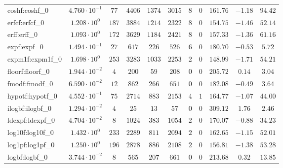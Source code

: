 \begin{tabular}{|l|c|c|c|c|c|c|c|c|c|c|}
coshf:coshf\_0               & $ 4.760 \cdot 10^{-1} $ & $ 77     $ & $ 4406  $ & $ 1374  $ & $ 3015  $ & $ 8   $ & $ 0 $ & $ 161.76      $ & $ -1.18   $ & $ 94.42   $ \\
erfcf:erfcf\_0               & $ 1.208 \cdot 10^{0}  $ & $ 187    $ & $ 3884  $ & $ 1214  $ & $ 2322  $ & $ 8   $ & $ 0 $ & $ 154.75      $ & $ -1.46   $ & $ 52.14   $ \\
erff:erff\_0                 & $ 1.093 \cdot 10^{0}  $ & $ 172    $ & $ 3629  $ & $ 1184  $ & $ 2421  $ & $ 8   $ & $ 0 $ & $ 157.33      $ & $ -1.36   $ & $ 61.16   $ \\
expf:expf\_0                 & $ 1.494 \cdot 10^{-1} $ & $ 27     $ & $ 617   $ & $ 226   $ & $ 526   $ & $ 6   $ & $ 0 $ & $ 180.70      $ & $ -0.53   $ & $ 5.72    $ \\
expm1f:expm1f\_0             & $ 1.698 \cdot 10^{0}  $ & $ 253    $ & $ 3283  $ & $ 1033  $ & $ 2253  $ & $ 2   $ & $ 0 $ & $ 148.99      $ & $ -1.71   $ & $ 54.21   $ \\
floorf:floorf\_0             & $ 1.944 \cdot 10^{-2} $ & $ 4      $ & $ 200   $ & $ 59    $ & $ 208   $ & $ 0   $ & $ 0 $ & $ 205.72      $ & $ 0.14    $ & $ 3.04    $ \\
fmodf:fmodf\_0               & $ 6.590 \cdot 10^{-2} $ & $ 12     $ & $ 862   $ & $ 266   $ & $ 651   $ & $ 0   $ & $ 0 $ & $ 182.08      $ & $ -0.49   $ & $ 3.64    $ \\
hypotf:hypotf\_0             & $ 4.552 \cdot 10^{-1} $ & $ 75     $ & $ 2714  $ & $ 883   $ & $ 2153  $ & $ 4   $ & $ 1 $ & $ 164.77      $ & $ -1.07   $ & $ 44.00   $ \\
ilogbf:ilogbf\_0             & $ 1.294 \cdot 10^{-2} $ & $ 4      $ & $ 25    $ & $ 13    $ & $ 57    $ & $ 0   $ & $ 0 $ & $ 309.12      $ & $ 1.76    $ & $ 2.46    $ \\
ldexpf:ldexpf\_0             & $ 4.704 \cdot 10^{-2} $ & $ 8      $ & $ 1024  $ & $ 383   $ & $ 1054  $ & $ 2   $ & $ 0 $ & $ 170.07      $ & $ -0.88   $ & $ 34.23   $ \\
log10f:log10f\_0             & $ 1.432 \cdot 10^{0}  $ & $ 233    $ & $ 2289  $ & $ 811   $ & $ 2094  $ & $ 2   $ & $ 0 $ & $ 162.65      $ & $ -1.15   $ & $ 52.01   $ \\
log1pf:log1pf\_0             & $ 1.250 \cdot 10^{0}  $ & $ 196    $ & $ 2878  $ & $ 886   $ & $ 2108  $ & $ 2   $ & $ 0 $ & $ 156.81      $ & $ -1.38   $ & $ 53.28   $ \\
logbf:logbf\_0               & $ 3.744 \cdot 10^{-2} $ & $ 8      $ & $ 565   $ & $ 207   $ & $ 661   $ & $ 0   $ & $ 0 $ & $ 213.68      $ & $ 0.32    $ & $ 13.85   $ \\

\end{tabular}

